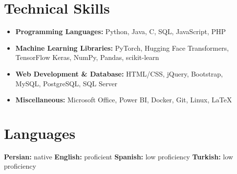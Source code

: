 \documentclass[letterpaper,10pt]{article}
\newenvironment{cvflat}
  {\begin{itemize}[leftmargin=0.16in,label=\textbullet,itemsep=2pt,parsep=0pt,topsep=4pt,partopsep=0pt]\small}
  {\end{itemize}}
\begin{document}
\section{Technical Skills}
\begin{cvflat}
  \item \textbf{Programming Languages:} Python, Java, C, SQL, JavaScript, PHP
  \item \textbf{Machine Learning Libraries:} PyTorch, Hugging Face Transformers, TensorFlow Keras, NumPy, Pandas, scikit-learn
  \item \textbf{Web Development \& Database:} HTML/CSS, jQuery, Bootstrap, MySQL, PostgreSQL, SQL Server
  \item \textbf{Miscellaneous:} Microsoft Office, Power BI, Docker, Git, Linux, \LaTeX
\end{cvflat}

\section{Languages}
\small \textbf{Persian:} native \hspace{10pt} \textbf{English:} proficient \hspace{10pt} \textbf{Spanish:} low proficiency \hspace{10pt} \textbf{Turkish:} low proficiency
\end{document}
